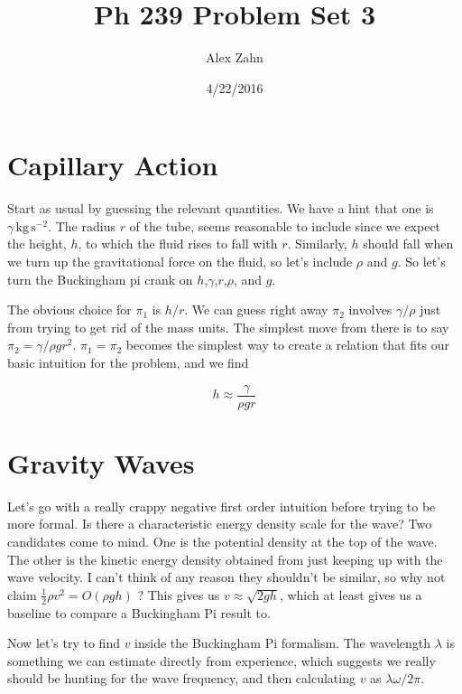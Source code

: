 \documentclass[12pt]{article}
\title{Ph 239 Problem Set 3}
\author{Alex Zahn}
\date{4/22/2016}
\begin{document}
\maketitle

\newcommand{\wmsq}{W/\(\mathrm{m}^2\,\)}
\newcommand{\msq}{\(\mathrm{m}^2\,\)}
\newcommand{\micron}{\(\mu\mathrm{m}\)\,}
\newcommand{\mcb}{\(\mathrm{m}^3\,\)}


\section{Capillary Action}

Start as usual by guessing the relevant quantities. We have a hint that one is \(\gamma \,\mathrm{kg}\,\mathrm{s}^{-2}\). The radius \(r\) of the tube, seems reasonable to include since we expect the height, \(h\), to which the fluid rises to fall with \(r\). Similarly, \(h\) should fall when we turn up the gravitational force on the fluid, so let's include \(\rho\) and \(g\). So let's turn the Buckingham pi crank on \(h\),\(\gamma\),\(r\),\(\rho\), and \(g\).

The obvious choice for \(\pi_1\) is \(h/r\). We can guess right away \(\pi_2\) involves \(\gamma/\rho\) just from trying to get rid of the mass units. The simplest move from there is to say \(\pi_2 = \gamma/\rho g r^2\). \(\pi_1 = \pi_2\) becomes the simplest way to create a relation that fits our basic intuition for the problem, and we find

\[ h \approx \frac{\gamma}{\rho g r}
\]

\section{Gravity Waves}

Let's go with a really crappy negative first order intuition before trying to be more formal. Is there a characteristic energy density scale for the wave? Two candidates come to mind. One is the potential density at the top of the wave. The other is the kinetic energy density obtained from just keeping up with the wave velocity. I can't think of any reason they shouldn't be similar, so why not claim \( \frac{1}{2}\rho v^2 = O(\rho g h) \) ? This gives us \(v\approx \sqrt{2gh}\), which at least gives us a baseline to compare a Buckingham Pi result to.

Now let's try to find \(v\) inside the Buckingham Pi formalism. The wavelength \(\lambda\) is something we can estimate directly from experience, which suggests we really should be hunting for the wave frequency, and then calculating \(v\) as \(\lambda \omega / 2\pi\).
\end{document}
